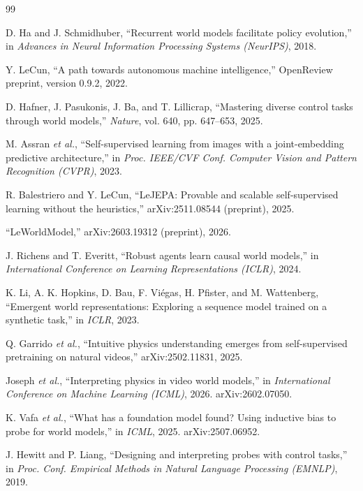 \documentclass[11pt, a4paper, oneside,enumerate,textcomp]{report}
\begin{document}
\newpage
{}
\begin{thebibliography}{99}

D. Ha and J. Schmidhuber, ``Recurrent world models facilitate policy evolution,'' in \emph{Advances in Neural Information Processing Systems (NeurIPS)}, 2018.

Y. LeCun, ``A path towards autonomous machine intelligence,'' OpenReview preprint, version 0.9.2, 2022.

D. Hafner, J. Pasukonis, J. Ba, and T. Lillicrap, ``Mastering diverse control tasks through world models,'' \emph{Nature}, vol. 640, pp. 647--653, 2025.

M. Assran \emph{et al.}, ``Self-supervised learning from images with a joint-embedding predictive architecture,'' in \emph{Proc. IEEE/CVF Conf. Computer Vision and Pattern Recognition (CVPR)}, 2023.

R. Balestriero and Y. LeCun, ``LeJEPA: Provable and scalable self-supervised learning without the heuristics,'' arXiv:2511.08544 (preprint), 2025.

``LeWorldModel,'' arXiv:2603.19312 (preprint), 2026.

J. Richens and T. Everitt, ``Robust agents learn causal world models,'' in \emph{International Conference on Learning Representations (ICLR)}, 2024.

K. Li, A. K. Hopkins, D. Bau, F. Vi\'egas, H. Pfister, and M. Wattenberg, ``Emergent world representations: Exploring a sequence model trained on a synthetic task,'' in \emph{ICLR}, 2023.

Q. Garrido \emph{et al.}, ``Intuitive physics understanding emerges from self-supervised pretraining on natural videos,'' arXiv:2502.11831, 2025.

Joseph \emph{et al.}, ``Interpreting physics in video world models,'' in \emph{International Conference on Machine Learning (ICML)}, 2026. arXiv:2602.07050.

K. Vafa \emph{et al.}, ``What has a foundation model found? Using inductive bias to probe for world models,'' in \emph{ICML}, 2025. arXiv:2507.06952.

J. Hewitt and P. Liang, ``Designing and interpreting probes with control tasks,'' in \emph{Proc. Conf. Empirical Methods in Natural Language Processing (EMNLP)}, 2019.


\end{thebibliography}
\end{document}
